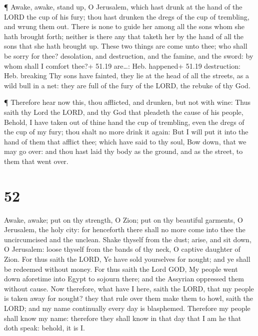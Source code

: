  ¶ Awake, awake, stand up, O Jerusalem, which hast drunk at
the hand of the LORD the cup of his fury; thou hast drunken the dregs of
the cup of trembling, and wrung them out.  There is none to
guide her among all the sons whom she hath brought forth; neither is
there any that taketh her by the hand of all the sons that she hath
brought up.  These two things are come unto thee; who shall
be sorry for thee? desolation, and destruction, and the famine, and the
sword: by whom shall I comfort thee?+ 51.19 are\ldots: Heb. happened+
51.19 destruction: Heb. breaking  Thy sons have fainted,
they lie at the head of all the streets, as a wild bull in a net: they
are full of the fury of the LORD, the rebuke of thy God.

 ¶ Therefore hear now this, thou afflicted, and drunken,
but not with wine:  Thus saith thy Lord the LORD, and thy
God that pleadeth the cause of his people, Behold, I have taken out of
thine hand the cup of trembling, even the dregs of the cup of my fury;
thou shalt no more drink it again:  But I will put it into
the hand of them that afflict thee; which have said to thy soul, Bow
down, that we may go over: and thou hast laid thy body as the ground,
and as the street, to them that went over.

\hypertarget{section-51}{%
\section{52}\label{section-51}}

 Awake, awake; put on thy strength, O Zion; put on thy
beautiful garments, O Jerusalem, the holy city: for henceforth there
shall no more come into thee the uncircumcised and the unclean.
 Shake thyself from the dust; arise, and sit down, O
Jerusalem: loose thyself from the bands of thy neck, O captive daughter
of Zion.  For thus saith the LORD, Ye have sold yourselves
for nought; and ye shall be redeemed without money.  For
thus saith the Lord GOD, My people went down aforetime into Egypt to
sojourn there; and the Assyrian oppressed them without cause.
 Now therefore, what have I here, saith the LORD, that my
people is taken away for nought? they that rule over them make them to
howl, saith the LORD; and my name continually every day is blasphemed.
 Therefore my people shall know my name: therefore they
shall know in that day that I am he that doth speak: behold, it is I.

